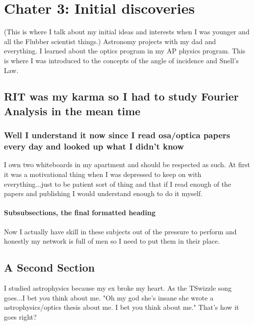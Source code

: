 \chapter{Chater 3: Initial discoveries}

(This is where I talk about my initial ideas and interests when I was younger and all the Flubber scientist things.) Astronomy projects with my dad and everything. 
I learned about the optics program in my AP physics program. This is where I was introduced to the concepts of the angle of incidence and Snell's Law. 

\section[Shorter Title]{RIT was my karma so I had to study Fourier Analysis in the mean time}



\subsection{Well I understand it now since I read osa/optica papers every day and looked up what I didn't know}

I own two whiteboards in my apartment and should be respected as such. At first it was a motivational thing when I was depressed to keep on with everything...just to be patient sort of thing and that if I read enough of the papers and publishing I would understand enough to do it myself. 

\subsubsection{Subsubsections, the final formatted heading}

Now I actually have skill in these subjects out of the pressure to perform and honestly my network is full of men so I need to put them in their place. 

\section{A Second Section}

I studied astrophysics because my ex broke my heart. As the TSwizzle song goes...I bet you think about me. "Oh my god she's insane she wrote a astrophysics/optics thesis about me. I bet you think about me." That's how it goes right?